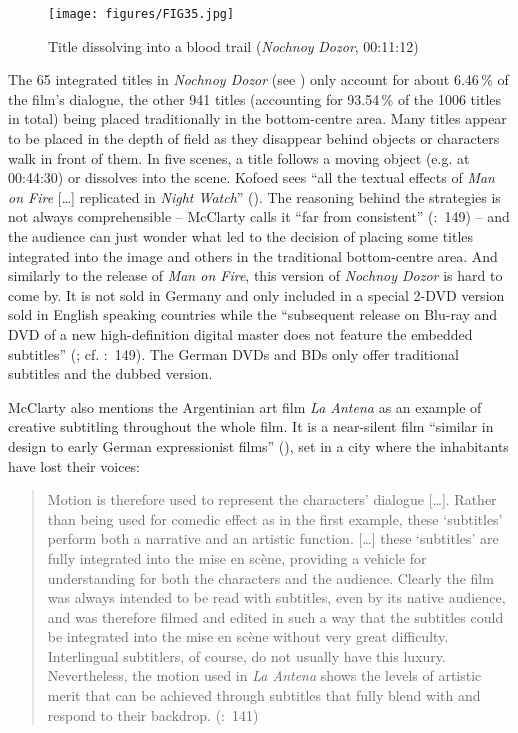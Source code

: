 \begin{figure}
\texttt{[image: figures/FIG35.jpg]}
\caption{Title dissolving into a blood trail (\textit{Nochnoy} \textit{Dozor}, 00:11:12)}
\label{fig:FIG35}
\end{figure}


The 65 integrated titles in \textit{Nochnoy Dozor} (see ) only account for about 6.46\,\% of the film’s dialogue, the other 941 titles (accounting for 93.54\,\% of the 1006 titles in total) being placed traditionally in the bottom-centre area. Many titles appear to be placed in the depth of field as they disappear behind objects or characters walk in front of them. In five scenes, a title follows a moving object (e.g. at 00:44:30) or dissolves into the scene. Kofoed sees “all the textual effects of \textit{Man on Fire} […] replicated in \textit{Night Watch}” (\citeyear{Kofoed2011}). The reasoning behind the  strategies is not always comprehensible – McClarty calls it “far from consistent” (\citeyear{mcclarty2012}:~149) – and the audience can just wonder what led to the decision of placing some titles integrated into the image and others in the traditional bottom-centre area. And similarly to the release of \textit{Man on Fire}, this version of \textit{Nochnoy Dozor} is hard to come by. It is not sold in Germany and only included in a special 2-DVD version sold in English speaking countries while the “subsequent release on Blu-ray and DVD of a new high-definition digital master does not feature the embedded subtitles” (\citealt{Kofoed2011}; cf. \citealt{mcclarty2012}:~149). The German DVDs and BDs only offer traditional subtitles and the dubbed version.


McClarty also mentions the Argentinian art film \textit{La Antena} as an example of creative subtitling throughout the whole film. It is a near-silent film “similar in design to early German expressionist films” (\citealt{Imdb-1????}), set in a city where the inhabitants have lost their voices:

\begin{quote}
Motion  is therefore used to represent the characters’ dialogue […]. Rather than being used for comedic effect as in the first example, these ‘subtitles’ perform both a narrative and an artistic function. […] these ‘subtitles’ are fully integrated into the mise en scène, providing a vehicle for understanding for both the characters and the audience. Clearly the film was always intended to be read with subtitles, even by its native audience, and was therefore filmed and edited in such a way that the subtitles could be integrated into the mise en scène without very great difficulty. Interlingual subtitlers, of course, do not usually have this luxury. Nevertheless, the motion  used in \textit{La Antena} shows the levels of artistic merit that can be achieved through subtitles that fully blend with and respond to their backdrop. (\citealt{mcclarty2012}:~141)
\end{quote}

